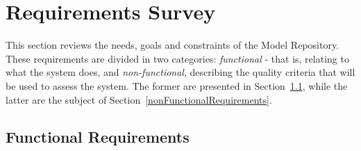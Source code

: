 \section{Requirements Survey}
\label{requirementsSurvey}
This section reviews the needs, goals and constraints of the \ddmore Model Repository. These requirements are divided in two categories: \textit{functional} - that is, relating to what the \gls{system} does, and \textit{non-functional}, describing the quality criteria that will be used to assess the system. The former are presented in Section~\ref{functionalRequirements}, while the latter are the subject of Section~\ref{nonFunctionalRequirements}.

\subsection{Functional Requirements}
\label{functionalRequirements}


